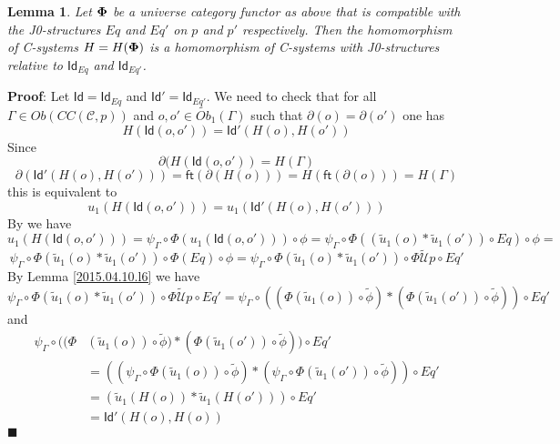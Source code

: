 \documentclass[12pt]{article}
\numberwithin{equation}{section}
\newenvironment{myproof}{{\bf Proof}:}{$\blacksquare$ \vskip 5mm }
\newtheorem{lemma}[proposition]{Lemma}
\newcommand{\llabel}[1]{\label{#1}}
\newcommand{\wt}{\widetilde}
\newcommand{\toCC}{CC} %
\newcommand{\C}{{\mathcal C}}  %
\newcommand{\ft}{\mathsf{ft}}
\newcommand{\Id}{\mathsf{Id}} %
\newcommand{\U}{\mathcal{U}}
\newcommand{\Obwt}{\wt{Ob}}
\begin{document}
\begin{lemma}
\llabel{2015.04.12.l1} Let ${\bf\Phi}$ be a universe category functor as above
that is compatible with the J0-structures $Eq$ and $Eq'$ on $p$ and $p'$
respectively. Then the homomorphism of C-systems $H=H({\bf\Phi})$ is a
homomorphism of C-systems with J0-structures relative to $\Id_{Eq}$ and
$\Id_{Eq'}$.
\end{lemma}
%
\begin{myproof}
Let $\Id=\Id_{Eq}$ and $\Id'=\Id_{Eq'}$. We need to check that for all
$\Gamma\in Ob(\toCC({\C},p))$ and $o,o'\in \Obwt_1(\Gamma)$ such that
$\partial(o)=\partial(o')$ one has
%
$$H(\Id(o,o'))=\Id'(H(o),H(o'))$$
%
Since
%
$$\partial(H(\Id(o,o'))=H(\Gamma)$$
%
$$\partial(\Id'(H(o),H(o')))=\ft(\partial(H(o)))=H(\ft(\partial(o)))=H(\Gamma)$$
%
this is equivalent to
%
$$u_1(H(\Id(o,o')))=u_1(\Id'(H(o),H(o')))$$
%
By \cite[Lemma 6.1(1)]{fromunivwithPi} we have
%
$$u_1(H(\Id(o,o')))=\psi_{\Gamma}\circ\Phi(u_1(\Id(o,o')))\circ\phi=\psi_{\Gamma}\circ\Phi((\wt{u}_1(o)*\wt{u}_1(o'))\circ
Eq)\circ\phi=$$
%
$$\psi_{\Gamma}\circ\Phi(\wt{u}_1(o)*\wt{u}_1(o'))\circ
\Phi(Eq)\circ\phi=\psi_{\Gamma}\circ\Phi(\wt{u}_1(o)*\wt{u}_1(o'))\circ
\Phi\wt{\U}p\circ Eq'$$
%
By Lemma \ref{2015.04.10.l6} we have
%
$$\psi_{\Gamma}\circ\Phi(\wt{u}_1(o)*\wt{u}_1(o'))\circ \Phi\wt{\U}p\circ
Eq'=\psi_{\Gamma}\circ((\Phi(\wt{u}_1(o))\circ\wt{\phi})*(\Phi(\wt{u}_1(o'))\circ\wt{\phi}))\circ
Eq'$$
%
and \cite[Lemma 6.1(2)]{fromunivwithPi}
%
\begin{align*}
  \psi_{\Gamma}\circ((\Phi&(\wt{u}_1(o))\circ\wt{\phi})*(\Phi(\wt{u}_1(o'))\circ\wt{\phi}))\circ Eq' \\
    & = ((\psi_{\Gamma}\circ\Phi(\wt{u}_1(o))\circ\wt{\phi})*(\psi_{\Gamma}\circ\Phi(\wt{u}_1(o'))\circ\wt{\phi}))\circ Eq' \\
    & = (\wt{u}_1(H(o))*\wt{u}_1(H(o')))\circ Eq' \\
    & = \Id'(H(o),H(o))
\end{align*}
\end{myproof}
\end{document}

